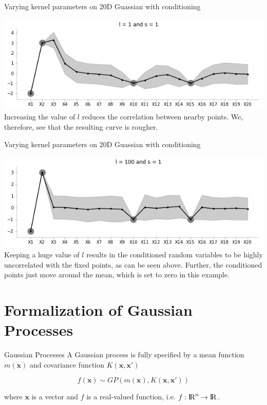 \documentclass{beamer}
\begin{document}
	\begin{frame}{Varying kernel parameters on 20D Guassian with conditioning}
		\begin{center}
			\includegraphics[width=\linewidth, height=\textheight -120pt ,keepaspectratio]{gp/kernel/20gp_ker3}\\
			Increasing the value of $l$ reduces the correlation between nearby points. We, therefore, see that the resulting curve is rougher.
		\end{center}
	\end{frame}
	
	\begin{frame}{Varying kernel parameters on 20D Guassian with conditioning}
		\begin{center}
			\includegraphics[width=\linewidth, height=\textheight -120pt ,keepaspectratio]{gp/kernel/20gp_ker4}\\
			Keeping a huge value of $l$ results in the conditioned random variables to be highly uncorrelated with the fixed points, as can be seen above. Further, the conditioned points just move around the mean, which is set to zero in this example.
		\end{center}
	\end{frame}
	
	\section{Formalization of Gaussian Processes}
	
	\begin{frame}{Gaussian Processes}
		A Gaussian process is fully specified by a mean function $m(\mathbf{x})$ and covariance function $K(\mathbf{x}, \mathbf{x'})$
		
		$$f(\mathbf{x}) \sim GP (m(\mathbf{x}),K(\mathbf{x}, \mathbf{x'}))$$
		
		where $\mathbf{x}$ is a vector and $f$ is a real-valued function, i.e. $f: {\rm I\!R}^n \rightarrow {\rm I\!R}$.
	\end{frame}
	
\end{document}
